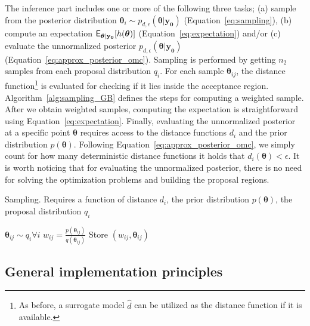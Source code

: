 \documentclass[article, shortnames]{jss}
\newcommand{\thetab}{\boldsymbol{\theta}}
\newcommand{\data}{\mathbf{y_0}}
\begin{document}
The inference part includes one or more of the following three tasks;
(a) sample from the posterior distribution
\( \thetab_i \sim p_{d, \epsilon}(\thetab|\data)\)
(Equation~\ref{eq:sampling}), (b) compute an expectation
\(\E_{\thetab|\data}[h(\thetab)]\) (Equation~\ref{eq:expectation})
and/or (c) evaluate the unnormalized posterior
\(p_{d, \epsilon}(\thetab|\data)\)
(Equation~\ref{eq:approx_posterior_omc}). Sampling is performed by
getting \(n_2\) samples from each proposal distribution \(q_i\). For
each sample \(\thetab_{ij}\), the distance function\footnote{As
  before, a surrogate model \(\hat{d}\) can be utilized as the
  distance function if it is available.} is evaluated for checking if
it lies inside the acceptance region. Algorithm~\ref{alg:sampling_GB}
defines the steps for computing a weighted sample. After we obtain
weighted samples, computing the expectation is straightforward using
Equation~\ref{eq:expectation}. Finally, evaluating the unnormalized
posterior at a specific point \(\thetab\) requires access to the
distance functions \(d_i\) and the prior distribution
\(p(\thetab)\). Following Equation~\ref{eq:approx_posterior_omc}, we
simply count for how many deterministic distance functions it holds
that \(d_i(\thetab) < \epsilon\). It is worth noticing that for
evaluating the unnormalized posterior, there is no need for solving
the optimization problems and building the proposal regions.

\begin{algorithm}[H]
    \centering
    \caption{Sampling. Requires a function of distance \(d_i\), the prior distribution \(p(\thetab)\), the proposal distribution \(q_i\)}\label{alg:sampling_GB}
    \begin{algorithmic}[1]
      \State \(\thetab_{ij} \sim q_i \forall i\) 
          \If {\(d_i(\thetab_{ij}) \leq \epsilon\)} 
            \State \(w_{ij} = \frac{p(\thetab_{ij})}{q(\thetab_{ij})}\) 
            \State Store \((w_{ij}, \thetab_{ij})\) 
            \EndIf
            \EndFor
    \EndFor
    \end{algorithmic}
\end{algorithm}


\subsection{General implementation principles}
\label{subsec:general_design}
\end{document}
